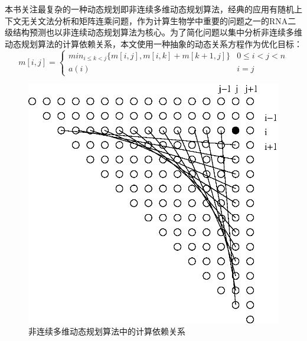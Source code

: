 \begin{flushleft}
本书关注最复杂的一种动态规划即非连续多维动态规划算法，经典的应用有随机上下文无关文法分析\citep{cyk-algo,cyk-algo-1,cyk-algo-2}和矩阵连乘\citep{algorithms-book,matrix-chain}问题，作为计算生物学中重要的问题之一的RNA二级结构预测\citep{rna-pred-bmb,rna-dp,rna-science}也以非连续动态规划算法为核心。为了简化问题以集中分析非连续多维动态规划算法的计算依赖关系，本文使用一种抽象的动态关系方程作为优化目标：
\begin{equation}\label{eq:abstract_dp}
m[i,j] = \left\{ \begin{array}{ll} min_{i \le k < j} \{m[i,j], m[i,k]+m[k+1,j]\} & \textrm{$0 \le i < j < n$}
\\
a(i) & \textrm{$i=j$}
\end{array} \right.
\end{equation}
\begin{figure}[!htbp]
	\begin{center}
		\includegraphics[scale=0.8]{Img/Chap_Algorithm/dp_dependence}
		\caption{非连续多维动态规划算法中的计算依赖关系}\label{fig:dp_dependence}
	\end{center}
\end{figure}


\end{flushleft}
